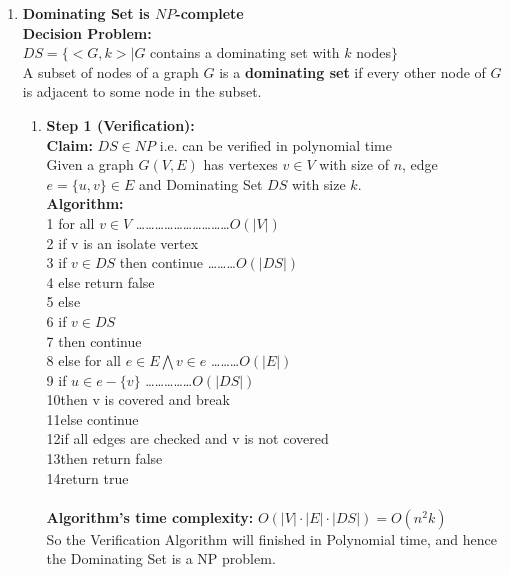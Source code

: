 \documentclass{article}
\begin{document}
\begin{enumerate}
   \item{\textbf{Dominating Set is $NP$-complete}} \\
   \textbf{Decision Problem:}\\
 $DS =\{<G,k>| G$ contains a dominating set with $k$ nodes$\}$\\
 A subset of nodes of a graph $G$ is a \textbf{dominating set} if every other node of $G$ is adjacent to some node in the subset.\\

  \begin{enumerate}
   \item\textbf{Step 1 (Verification): }\\
		 \textbf{Claim:} $DS \in NP$ i.e. can be verified in polynomial time\\
    Given a graph $G(V,E)$ has vertexes $v\in V$ with size of $n$, edge $e=\{u,v\} \in E$ and Dominating Set $DS$ with size $k$.\\
    \textbf{Algorithm: }\\
    1 \quad for all $v\in V$ \dots\dots\dots\dots\dots\dots\dots\dots\dots\dots $O(|V|)$\\
    2 \quad\quad\quad if v is an isolate vertex\\
    3 \quad\quad\quad\quad\quad if $v\in DS$ then continue \dots\dots\dots  $O(|DS|)$\\
    4 \quad\quad\quad\quad\quad else return false\\
    5 \quad\quad\quad else\\
    6 \quad\quad\quad\quad\quad if $v\in DS$\\
    7 \quad\quad\quad\quad\quad\quad\quad then continue\\
    8 \quad\quad\quad\quad\quad else for all $e\in E \bigwedge v\in e$ \dots\dots\dots $O(|E|)$\\
    9 \quad\quad\quad\quad\quad\quad\quad if $u\in e-\{v\}$ \dots\dots\dots\dots\dots $O(|DS|)$\\
    10\quad\quad\quad\quad\quad\quad\quad\quad\quad then v is covered and break\\
    11\quad\quad\quad\quad\quad\quad\quad else continue\\
    12\quad\quad\quad\quad\quad\quad\quad if all edges are checked and v is not covered\\
    13\quad\quad\quad\quad\quad\quad\quad\quad\quad then return false\\
    14\quad return true\\ \\
    \textbf{Algorithm's time complexity: } $O(|V|\cdot |E|\cdot |DS|)=O(n^2k)$ \\
    So the Verification Algorithm will finished in Polynomial time, and hence the Dominating Set is a NP problem.


\end{enumerate}
\end{enumerate}
\end{document}
